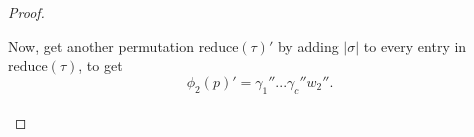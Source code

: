 \documentclass[11pt]{amsart}
\theoremstyle{remark}
\numberwithin{equation}{section}
\begin{document}
\begin{proof}
\begin{figure}[H]
\end{figure}
Now, get another permutation $\text{reduce}(\tau)'$ by adding $|\sigma|$ to every entry in $\text{reduce}(\tau)$, to get
\[
\phi_2(p)'   = \gamma_1'' ... \gamma_c'' w_2''.
\]
\\


\end{proof}
\end{document}
